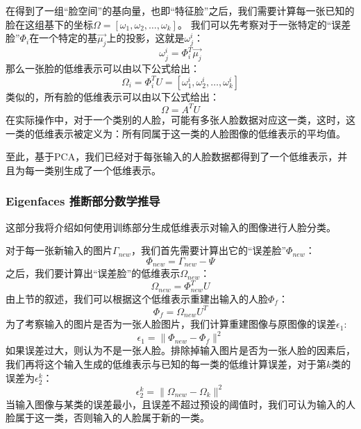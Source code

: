 \documentclass{ctexart}
\begin{document}
    \noindent
    在得到了一组“脸空间”的基向量，也即“特征脸”之后，我们需要计算每一张已知的脸在这组基下的坐标$\Omega=[\omega_1, \omega_2, \dots, \omega_k]$。
    我们可以先考察对于一张特定的“误差脸”$\Phi_i$在一个特定的基$\vec{\mu_j}$上的投影，这就是$\omega^i_j$：
    $$
    \omega^i_j = \Phi_i^T \vec{\mu_j}
    $$
    那么一张脸的低维表示可以由以下公式给出：
    $$
    \Omega_i = \Phi_i^T U = [\omega_1^i, \omega_2^i, \dots, \omega_k^i]
    $$
    类似的，所有脸的低维表示可以由以下公式给出：
    $$
    \Omega = A^T U
    $$
    在实际操作中，对于一个类别的人脸，可能有多张人脸数据对应这一类，这时，这一类的低维表示被定义为：所有同属于这一类的人脸图像的低维表示的平均值。

    至此，基于PCA，我们已经对于每张输入的人脸数据都得到了一个低维表示，并且为每一类别生成了一个低维表示。
    \subsubsection{Eigenfaces 推断部分数学推导}

    这部分我将介绍如何使用训练部分生成低维表示对输入的图像进行人脸分类。

    \noindent
    对于每一张新输入的图片$\Gamma_{new}$，我们首先需要计算出它的“误差脸”$\Phi_{new}$：
    $$
    \Phi_{new} = \Gamma_{new} - \Psi
    $$
    之后，我们要计算出“误差脸”的低维表示$\Omega_{new}$：
    $$
    \Omega_{new} = \Phi_{new}^TU
    $$
    由上节的叙述，我们可以根据这个低维表示重建出输入的人脸$\Phi_{f}$：
    $$
    \Phi_f = \Omega_{new}U^T
    $$
    为了考察输入的图片是否为一张人脸图片，我们计算重建图像与原图像的误差$\epsilon_1$:
    $$
    \epsilon_1 = \|\Phi_{new}-\Phi_f\|^2
    $$
    如果误差过大，则认为不是一张人脸。排除掉输入图片是否为一张人脸的因素后，我们再将这个输入生成的低维表示与已知的每一类的低维计算误差，对于第$k$类的误差为$\epsilon^k_2$：
    $$
    \epsilon^k_2 = \| \Omega_{new} - \Omega_k \|^2
    $$
    当输入图像与某类的误差最小，且误差不超过预设的阈值时，我们可认为输入的人脸属于这一类，否则输入的人脸属于新的一类。
\end{document}
